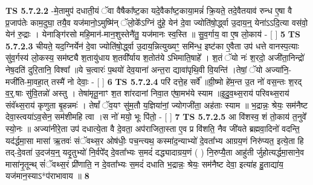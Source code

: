 \documentclass[17pt]{extarticle}
\begin{document}
                  \newline
                                \textbf{ TS 5.7.2.2} \newline
                  -मे॒तामुप॑ दधाती॒यं ॅवा वैषैका᳚ष्ट॒का यदे॒वैका᳚ष्ट॒काया॒मन्नं॑ क्रि॒यते॒ तदे॒वैतयाव॑ रुन्ध ए॒षा वै प्र॒जाप॑तेः काम॒दुघा॒ तयै॒व यज॑मानो॒ऽमुष्मि॑न् ॅलो॒के᳚ऽग्निं दु॑हे॒ येन॑ दे॒वा ज्योति॑षो॒र्द्ध्वा उ॒दाय॒न्॒ येना॑ऽऽदि॒त्या वस॑वो॒ येन॑ रु॒द्राः । येनाङ्गि॑रसो महि॒मान॑-मान॒शुस्तेनै॑तु॒ यज॑मानः स्व॒स्ति ॥ सु॒व॒र्गाय॒ वा ए॒ष लो॒काय॑ - [  ] \textbf{  5} \newline
                  \newline
                                \textbf{ TS 5.7.2.3} \newline
                  चीयते॒ यद॒ग्निर्येन॑ दे॒वा ज्योति॑षो॒र्द्ध्वा उ॒दाय॒न्नित्युख्यꣳ॒॒ समि॑न्ध॒  इष्ट॑का ए॒वैता उप॑ धत्ते वानस्प॒त्याः सु॑व॒र्गस्य॑ लो॒कस्य॒ सम॑ष्ट्यै श॒तायु॑धाय श॒तवी᳚र्याय श॒तोत॑ये ऽभिमाति॒षाहे᳚ । श॒तं ॅयो नः॑ श॒रदो॒ अजी॑ता॒निन्द्रो॑ नेष॒दति॑ दुरि॒तानि॒ विश्वा᳚ ॥ये च॒त्वारः॑ प॒थयो॑ देव॒याना॑ अन्त॒रा द्यावा॑पृथि॒वी वि॒यन्ति॑ ।तेषां॒ ॅयो अज्या॑नि॒- मजी॑ति-मा॒वहा॒त् तस्मै॑ नो देवाः॒ - [  ] \textbf{  6} \newline
                  \newline
                                \textbf{ TS 5.7.2.4} \newline
                  परि॑ दत्ते॒ह सर्वे᳚ ॥ग्री॒ष्मो हे॑म॒न्त उ॒त नो॑ वस॒न्तः श॒रद् व॒र्॒.षाः सु॑वि॒तन्नो॑ अस्तु । तेषा॑मृतू॒नाꣳ श॒त शा॑रदानां निवा॒त ए॑षा॒मभ॑ये स्याम ॥इ॒दु॒व॒थ्स॒राय॑ परिवथ्स॒राय॑ संवॅथ्स॒राय॑ कृणुता बृ॒हन्नमः॑ । तेषां᳚ ॅव॒यꣳ सु॑म॒तौ य॒ज्ञिया॑नां॒ ज्योगजी॑ता॒ अह॑ताः स्याम ॥ भ॒द्रान्नः॒ श्रेयः॒ सम॑नैष्ट देवा॒स्त्वया॑ऽव॒सेन॒ सम॑शीमहि त्वा ।स नो॑ मयो॒ भूः पि॑तो॒ - [  ] \textbf{  7} \newline
                  \newline
                                \textbf{ TS 5.7.2.5} \newline
                  आ वि॑शस्व॒ शं तो॒काय॑ त॒नुवे᳚ स्यो॒नः ॥ अज्या॑नीरे॒ता उप॑ दधात्ये॒ता वै दे॒वता॒ अप॑राजिता॒स्ता ए॒व प्र वि॑शति॒ नैव जी॑यते ब्रह्मवा॒दिनो॑ वदन्ति॒ यद॑र्द्धमा॒सा मासा॑ ऋ॒तवः॑ संॅवथ्स॒र ओष॑धीः॒ पच॒न्त्यथ॒ कस्मा॑द॒न्याभ्यो॑ दे॒वता᳚भ्य आग्रय॒णं निरु॑प्यत॒ इत्ये॒ता हि तद्-दे॒वता॑ उ॒दज॑य॒न्॒ यदृ॒तुभ्यो॑ नि॒र्वपे᳚द् दे॒वता᳚भ्यः स॒मदं॑ दद्ध्यादाग्रय॒णं ( ) नि॒रुप्यै॒ता आहु॑ती र्जुहोत्यर्द्धमा॒साने॒व मासा॑नृ॒तून्थ् सं॑ॅवथ्स॒रं प्री॑णाति॒ न दे॒वता᳚भ्यः स॒मदं॑ दधाति भ॒द्रान्नः॒ श्रेयः॒ सम॑नैष्ट देवा॒ इत्या॑ह हु॒ताद्या॑य॒ यज॑मान॒स्याऽ*प॑राभावाय ॥ \textbf{  8} \newline
\end{document}
